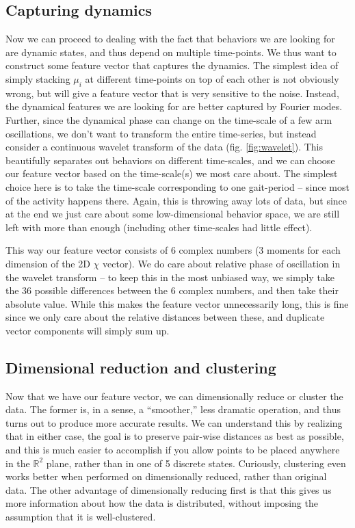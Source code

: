 \documentclass[reprint,prx]{revtex4-1}
\renewcommand{\=}[1]{\stackrel{#1}{=}} %
\renewcommand{\(}{\left (}
\renewcommand{\)}{\right  )}
\renewcommand{\[}{\left [}
\renewcommand{\]}{\right ]}
\newcommand{\<}{\left <}
\renewcommand{\>}{\right >}
\theoremstyle{definition}
\theoremstyle{remark}
\begin{document}
\subsection{Capturing dynamics}
Now we can proceed to dealing with the fact that behaviors we are looking for are dynamic states, and thus depend on multiple time-points. We thus want to construct some feature vector that captures the dynamics. The simplest idea of simply stacking $ \mu_i $ at different time-points on top of each other is not obviously wrong, but will give a feature vector that is very sensitive to the noise. Instead, the dynamical features we are looking for are better captured by Fourier modes. Further, since the dynamical phase can change on the time-scale of a few arm oscillations, we don't want to transform the entire time-series, but instead consider a continuous wavelet transform of the data (fig. \ref{fig:wavelet}). This beautifully separates out behaviors on different time-scales, and we can choose our feature vector based on the time-scale(s) we most care about. The simplest choice here is to take the time-scale corresponding to one gait-period -- since most of the activity happens there. Again, this is throwing away lots of data, but since at the end we just care about some low-dimensional behavior space, we are still left with more than enough (including other time-scales had little effect). 

This way our feature vector consists of 6 complex numbers (3 moments for each dimension of the 2D $ \chi $ vector). We do care about relative phase of oscillation in the wavelet transform -- to keep this in the most unbiased way, we simply take the 36 possible differences between the 6 complex numbers, and then take their absolute value. While this makes the feature vector unnecessarily long, this is fine since we only care about the relative distances between these, and duplicate vector components will simply sum up.

\subsection{Dimensional reduction and clustering}
Now that we have our feature vector, we can dimensionally reduce or cluster the data. The former is, in a sense, a ``smoother,'' less dramatic operation, and thus turns out to produce more accurate results. We can understand this by realizing that in either case, the goal is to preserve pair-wise distances as best as possible, and this is much easier to accomplish if you allow points to be placed anywhere in the $ \mathbb{R}^2 $ plane, rather than in one of 5 discrete states. Curiously, clustering even works better when performed on dimensionally reduced, rather than original data. The other advantage of dimensionally reducing first is that this gives us more information about how the data is distributed, without imposing the assumption that it is well-clustered. 
\end{document}
